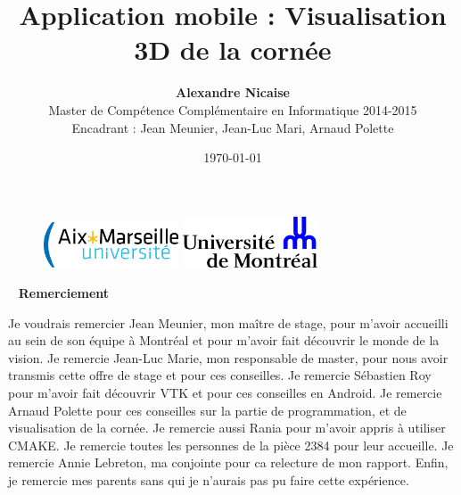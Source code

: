 \documentclass[a4paper,12pt]{article}
\author{\textbf{Alexandre Nicaise}\\Master de Compétence Complémentaire en Informatique 2014-2015 \\Encadrant : Jean Meunier, Jean-Luc Mari, Arnaud Polette}
\title{\vfill \textbf{Application mobile : Visualisation 3D de la cornée}}
\date{\today\vfill}
\begin{document}
\renewcommand{\tablename}{Tableau}

\begin{figure}
    \begin{minipage}[t]{6cm}
        \includegraphics[width=4cm]{amu.png}
    \end{minipage}
    \begin{minipage}[t]{10cm}
    	\raggedleft
        \includegraphics[width=4cm]{logoUDEM.png}
    \end{minipage}
\end{figure}


\maketitle

\thispagestyle{empty}



\newpage
~
\vfill
\textbf{Remerciement}
\thispagestyle{empty}


Je voudrais remercier Jean Meunier, mon ma\^itre de stage, pour m'avoir accueilli au sein de son équipe à Montréal et pour m'avoir fait découvrir le monde de la vision. Je remercie Jean-Luc Marie, mon responsable de master, pour nous avoir transmis cette offre de stage et pour ces conseilles. Je remercie Sébastien Roy pour m'avoir fait découvrir VTK et pour ces conseilles en Android. Je remercie Arnaud Polette pour ces conseilles sur la partie de programmation, et de visualisation de la cornée. Je remercie aussi Rania pour m'avoir appris  à utiliser CMAKE. Je remercie toutes les personnes de la pièce 2384 pour leur accueille. Je remercie Annie Lebreton, ma conjointe pour ca relecture de mon rapport. Enfin, je remercie mes parents sans qui je n'aurais pas pu faire cette expérience.
\vfill

\newpage
\tableofcontents
\thispagestyle{empty}



\newpage
\setcounter{page}{1}
\pagestyle{plain}
\end{document}
